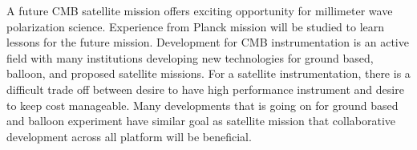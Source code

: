 A future CMB satellite mission offers exciting opportunity for millimeter wave polarization science. 
Experience from Planck mission will be studied to learn lessons for the future mission.
Development for CMB instrumentation is an active field with many institutions developing new technologies for ground based, balloon, and proposed satellite missions.
For a satellite instrumentation, there is a difficult trade off between desire to have high performance instrument and desire to keep cost manageable.
Many developments that is going on for ground based and balloon experiment have similar goal as satellite mission that collaborative development across all platform will be beneficial.

